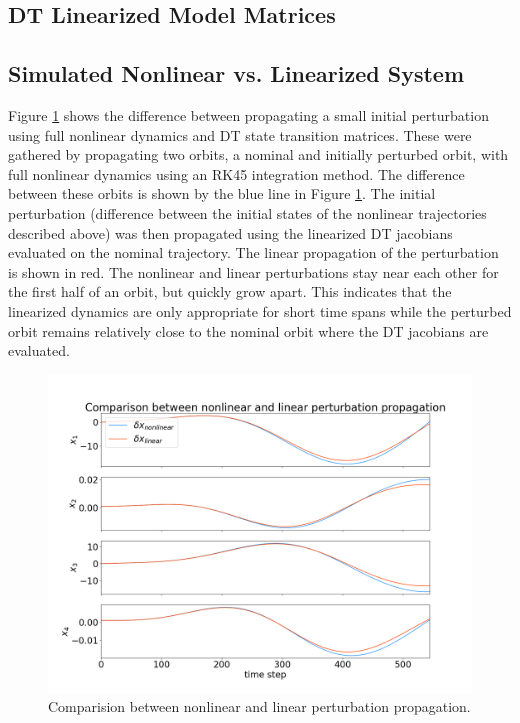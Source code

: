 \documentclass[11pt, a4paper]{article}
\begin{document}
\subsection{DT Linearized Model Matrices}


\subsection{Simulated Nonlinear vs. Linearized System}
Figure \ref{fig:nlvl_s} shows the difference between propagating a small initial perturbation using full nonlinear dynamics and DT state transition matrices. 
These were gathered by propagating two orbits, a nominal and initially perturbed orbit, with full nonlinear dynamics using an RK45 integration method.
The difference between these orbits is shown by the blue line in Figure \ref{fig:nlvl_s}. 
The initial perturbation (difference between the initial states of the nonlinear trajectories described above) was then propagated using the linearized DT jacobians evaluated on the nominal trajectory. 
The linear propagation of the perturbation is shown in red. 
The nonlinear and linear perturbations stay near each other for the first half of an orbit, but quickly grow apart.
This indicates that the linearized dynamics are only appropriate for short time spans while the perturbed orbit remains relatively close to the nominal orbit where the DT jacobians are evaluated. 

\begin{figure}[H]
	\centering
	\includegraphics[width=\textwidth]{./Figures/nonlvl_state.png}
	\caption{Comparision between nonlinear and linear perturbation propagation.}
	\label{fig:nlvl_s}
\end{figure}
\end{document}
